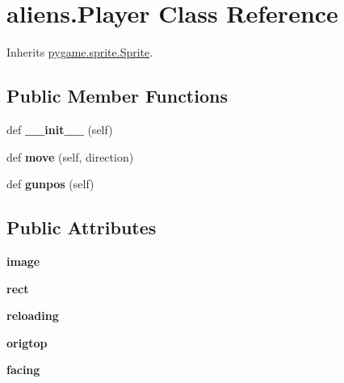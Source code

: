 \hypertarget{classaliens_1_1_player}{}\section{aliens.\+Player Class Reference}
\label{classaliens_1_1_player}


Inherits \hyperlink{classpygame_1_1sprite_1_1_sprite}{pygame.\+sprite.\+Sprite}.

\subsection*{Public Member Functions}
\begin{DoxyCompactItemize}
\item 
\mbox{\label{classaliens_1_1_player_a4097f3a663dbc0d239d328a3b8ab0dfd}} 
def {\bfseries \+\_\+\+\_\+init\+\_\+\+\_\+} (self)
\item 
\mbox{\label{classaliens_1_1_player_ace666ae7c987a9c2af4739df241098a2}} 
def {\bfseries move} (self, direction)
\item 
\mbox{\label{classaliens_1_1_player_a69a4962e3ece463348bde2a8d4b112b0}} 
def {\bfseries gunpos} (self)
\end{DoxyCompactItemize}
\subsection*{Public Attributes}
\begin{DoxyCompactItemize}
\item 
\mbox{\label{classaliens_1_1_player_a7514599c0bdfab635f75db7ecf030580}} 
{\bfseries image}
\item 
\mbox{\label{classaliens_1_1_player_ab4d61551d5cdfacc6c0ca699596f014b}} 
{\bfseries rect}
\item 
\mbox{\label{classaliens_1_1_player_aa9be7ef6f48736843992257cebdc1aff}} 
{\bfseries reloading}
\item 
\mbox{\label{classaliens_1_1_player_adadbfdb09ab98c97111854e77e86f4fc}} 
{\bfseries origtop}
\item 
\mbox{\label{classaliens_1_1_player_a43c8bb9442e89e59cd198cb74a737ead}} 
{\bfseries facing}
\end{DoxyCompactItemize}
